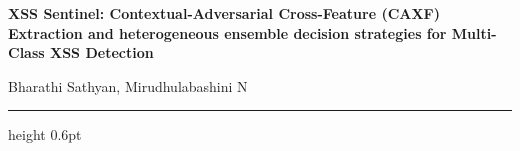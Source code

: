 \documentclass[11pt,a4paper]{article}
\begin{document}

\begin{center}
  {\LARGE\bfseries
   XSS Sentinel: Contextual-Adversarial Cross-Feature (CAXF) Extraction and heterogeneous ensemble decision strategies for Multi-Class XSS Detection}
  \vspace{1em}

  {\large Bharathi Sathyan, Mirudhulabashini N}


  \vspace{0.5em}
  \hrule height 0.6pt
\end{center}

\vspace{1em}

\end{document}

